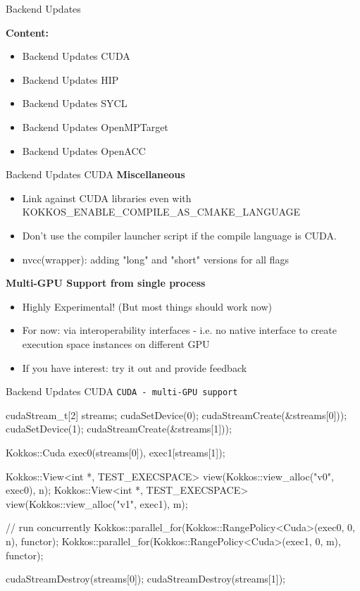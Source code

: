 

\begin{frame}[fragile]

  {\Huge Backend Updates}

  \vspace{10pt}

  \textbf{Content:}
  \begin{itemize}
    \item Backend Updates CUDA
    \item Backend Updates HIP
    \item Backend Updates SYCL
    \item Backend Updates OpenMPTarget
    \item Backend Updates OpenACC
  \end{itemize}

\end{frame}


\begin{frame}{Backend Updates CUDA}
\textbf{Miscellaneous}
\begin{itemize}
\item Link against CUDA libraries even with KOKKOS\_ENABLE\_COMPILE\_AS\_CMAKE\_LANGUAGE
\item Don't use the compiler launcher script if the compile language is CUDA.
\item nvcc(wrapper): adding "long" and "short" versions for all flags
\end{itemize}

\textbf{Multi-GPU Support from single process}
\begin{itemize}
\item Highly Experimental! (But most things should work now)
\item For now: via interoperability interfaces - i.e. no native interface to create execution space instances on different GPU
\item If you have interest: try it out and provide feedback
\end{itemize}
\end{frame}

\begin{frame}[fragile]{Backend Updates CUDA}
\texttt{CUDA - multi-GPU support}
\begin{code}
  cudaStream_t[2] streams;
  cudaSetDevice(0);
  cudaStreamCreate(&streams[0]));
  cudaSetDevice(1);
  cudaStreamCreate(&streams[1]));
  {
    Kokkos::Cuda exec0(streams[0]), exec1[streams[1]);

    Kokkos::View<int *, TEST_EXECSPACE> view(Kokkos::view_alloc("v0", exec0), n);
    Kokkos::View<int *, TEST_EXECSPACE> view(Kokkos::view_alloc("v1", exec1), m);

    // run concurrently
    Kokkos::parallel_for(Kokkos::RangePolicy<Cuda>(exec0, 0, n), functor);
    Kokkos::parallel_for(Kokkos::RangePolicy<Cuda>(exec1, 0, m), functor);
  }
  cudaStreamDestroy(streams[0]);
  cudaStreamDestroy(streams[1]);
\end{code}
\end{frame}


